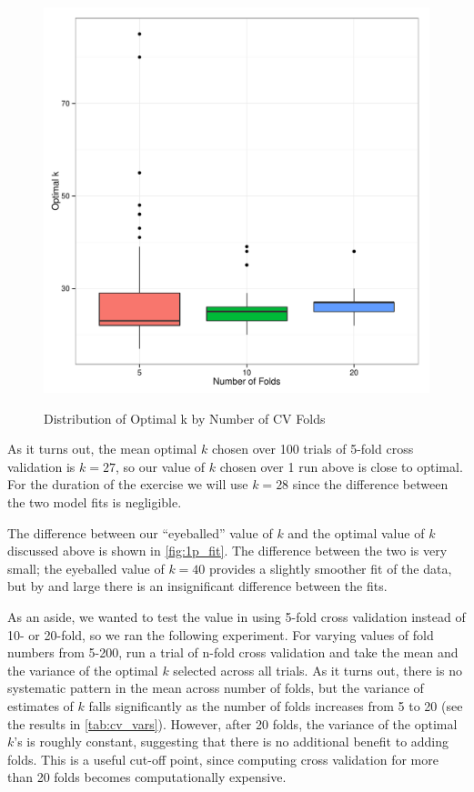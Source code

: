 \documentclass[11pt, fleqn]{article}
\begin{document}
\begin{figure}[!htb]
  \centering
  \caption{Distribution of Optimal k by Number of CV Folds}
  \includegraphics[scale=.5]{nfolds_k_dist.pdf}
  \label{fig:nfolds_k_dist}
\end{figure}

As it turns out, the mean optimal $k$ chosen over 100 trials of 5-fold cross validation is $k=27$, so our value of $k$ chosen over 1 run above is close to optimal. For the duration of the exercise we will use $k=28$ since the difference between the two model fits is negligible.

The difference between our ``eyeballed'' value of $k$ and the optimal value of $k$ discussed above is shown in \cref{fig:1p_fit}. The difference between the two is very small; the eyeballed value of $k=40$ provides a slightly smoother fit of the data, but by and large there is an insignificant difference between the fits.

As an aside, we wanted to test the value in using 5-fold cross validation instead of 10- or 20-fold, so we ran the following experiment. For varying values of fold numbers from 5-200, run a trial of n-fold cross validation and take the mean and the variance of the optimal $k$ selected across all trials. As it turns out, there is no systematic pattern in the mean across number of folds, but the variance of estimates of $k$ falls significantly as the number of folds increases from 5 to 20 (see the results in \cref{tab:cv_vars}). However, after 20 folds, the variance of the optimal $k$'s is roughly constant, suggesting that there is no additional benefit to adding folds. This is a useful cut-off point, since computing cross validation for more than 20 folds becomes computationally expensive.
\end{document}
